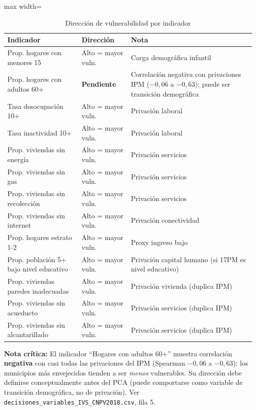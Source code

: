 \begin{table}[htbp]
\centering
\caption{Dirección de vulnerabilidad por indicador}
\label{tab:direccion_vulnerabilidad}
\begin{adjustbox}{max width=\textwidth}
\begin{tabular}{@{}lll@{}}
\toprule
\textbf{Indicador} & \textbf{Dirección} & \textbf{Nota} \\
\midrule
Prop. hogares con menores 15 & Alto = mayor vuln. & Carga demográfica infantil \\
Prop. hogares con adultos 60+ & \textbf{Pendiente} & Correlación negativa con privaciones IPM ($-0,06$ a $-0,63$); puede ser transición demográfica \\
Tasa desocupación 10+ & Alto = mayor vuln. & Privación laboral \\
Tasa inactividad 10+ & Alto = mayor vuln. & Privación laboral \\
Prop. viviendas sin energía & Alto = mayor vuln. & Privación servicios \\
Prop. viviendas sin gas & Alto = mayor vuln. & Privación servicios \\
Prop. viviendas sin recolección & Alto = mayor vuln. & Privación servicios \\
Prop. viviendas sin internet & Alto = mayor vuln. & Privación conectividad \\
Prop. hogares estrato 1-2 & Alto = mayor vuln. & Proxy ingreso bajo \\
Prop. población 5+ bajo nivel educativo & Alto = mayor vuln. & Privación capital humano (si 17PM es nivel educativo) \\
Prop. viviendas paredes inadecuadas & Alto = mayor vuln. & Privación vivienda (duplica IPM) \\
Prop. viviendas sin acueducto & Alto = mayor vuln. & Privación servicios (duplica IPM) \\
Prop. viviendas sin alcantarillado & Alto = mayor vuln. & Privación servicios (duplica IPM) \\
\bottomrule
\end{tabular}
\end{adjustbox}
\end{table}

\textbf{Nota crítica:} El indicador ``Hogares con adultos 60+'' muestra correlación \textbf{negativa} con casi todas las privaciones del IPM (Spearman $-0,06$ a $-0,63$): los municipios más envejecidos tienden a ser \textit{menos} vulnerables. Su dirección debe definirse conceptualmente antes del PCA (puede comportarse como variable de transición demográfica, no de privación). Ver \texttt{decisiones\_variables\_IVS\_CNPV2018.csv}, fila 5.

